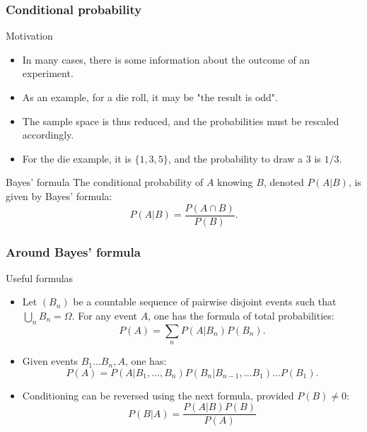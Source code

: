 \documentclass[main.tex]{subfiles}
\begin{document}
\begin{frame}
    \frametitle{Conditional probability}
    \begin{block}{Motivation}
    \begin{itemize}
        \item<+-> In many cases, there is some information about the outcome of
        an experiment.
        \item<+-> As an example, for a die roll, it may be "the result is odd".
        \item<+-> The sample space is thus reduced, and the probabilities must 
        be rescaled accordingly.
        \item<+-> For the die example, it is $\{1,3,5\}$, and the probability 
        to draw a $3$ is $1/3.$
    \end{itemize}
    \end{block}
    \begin{block}{Bayes' formula}
        The conditional probability of $A$ knowing $B$, denoted $P\left( A \vert B \right)$, is given by Bayes' formula:
        \begin{equation}
            P\left( A \vert B  \right) = \frac{P\left( A \cap B \right)}{P(B)}.
        \end{equation}
    \end{block}
\end{frame}
\begin{frame}
    \frametitle{Around Bayes' formula}
    \begin{block}{Useful formulas}
    \begin{itemize}
        \item<+-> Let $\left(B_n\right)$ be a countable sequence of pairwise disjoint events such that $\bigcup_n B_n = \Omega.$ For any event $A$,
        one has the formula of total probabilities:
        \begin{equation}
            P\left( A \right) = \sum_n P\left( A \vert B_n \right) P\left( B_n \right).
        \end{equation}
        \item<+-> Given events $B_1 \dots B_n, A$, one has:
        \begin{equation}
            P\left( A \right) = P\left( A \vert B_1, \dots, B_n \right)P(B_n \vert B_{n-1}, \dots B_1)\dots P\left( B_1 \right).
        \end{equation}
        \item<+-> Conditioning can be reversed using the next formula, provided $P(B) \neq 0:$
        \begin{equation}
            P\left( B \vert A \right) = \frac{P\left( A \vert B \right) P(B)}{P(A)}
        \end{equation}
       \end{itemize}
    \end{block}
\end{frame}
\end{document}
